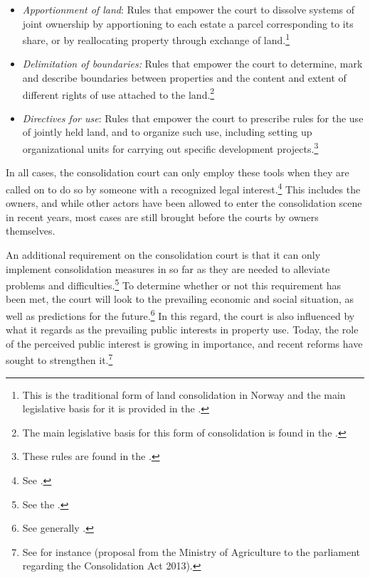 \begin{itemize}
\item \emph{Apportionment of land}: Rules that empower the court to dissolve systems of joint ownership by apportioning to each estate a parcel corresponding to its share, or by reallocating property through exchange of land.\footnote{This is the traditional form of land consolidation in Norway and the main legislative basis for it is provided in the \cite[2 a)-b)]{lca79}.}
\item \emph{Delimitation of boundaries:} Rules that empower the court to determine, mark and describe boundaries between properties and the content and extent of different rights of use attached to the land.\footnote{The main legislative basis for this form of consolidation is found in the \cite[88]{lca79}.}
\item \emph{Directives for use}: Rules that empower the court to prescribe rules for the use of jointly held land, and to organize such use, including setting up organizational units for carrying out specific development projects.\footnote{These rules are found in the \cite[2 c)|34-35]{lca79}.}
\end{itemize}

In all cases, the consolidation court can only employ these tools when they are called on to do so by someone with a recognized legal interest.\footnote{See \cite[5]{lca79}.} This includes the owners, and while other actors have been allowed to enter the consolidation scene in recent years, most cases are still brought before the courts by owners themselves.

An additional requirement on the consolidation court is that it can only implement consolidation measures in so far as they are needed to alleviate problems and difficulties.\footnote{See the \cite[1]{lca79}.} To determine whether or not this requirement has been met, the court will look to the prevailing economic and social situation, as well as predictions for the future.\footnote{See generally \cite{reiten09}.} In this regard, the court is also influenced by what it regards as the prevailing public interests in property use. Today, the role of the perceived public interest is growing in importance, and recent reforms have sought to strengthen it.\footnote{See for instance \cite{prop12} (proposal from the Ministry of Agriculture to the parliament regarding the Consolidation Act 2013).}

